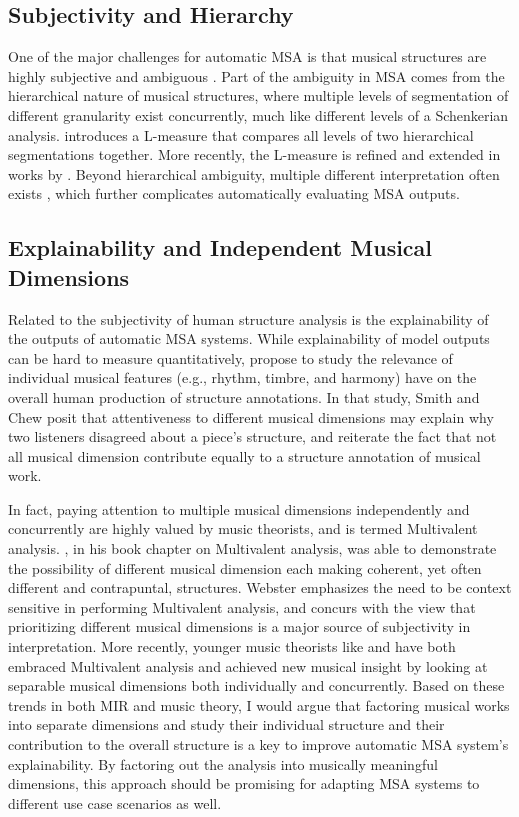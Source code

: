 \subsection{Subjectivity and Hierarchy}
One of the major challenges for automatic MSA is that musical structures are highly subjective and ambiguous \citep{smith2014b}.
Part of the ambiguity in MSA comes from the hierarchical nature of musical structures, where multiple levels of segmentation of different granularity exist concurrently, much like different levels of a Schenkerian analysis.
\cite{mcfee2017evaluating} introduces a L-measure that compares all levels of two hierarchical segmentations together.
More recently, the L-measure is refined and extended in works by \cite{kinnaird2021automatic}.
Beyond hierarchical ambiguity, multiple different interpretation often exists \citep{wang2017, serra2014}, which further complicates automatically evaluating MSA outputs.

\subsection{Explainability and Independent Musical Dimensions}
Related to the subjectivity of human structure analysis is the explainability of the outputs of automatic MSA systems.
While explainability of model outputs can be hard to measure quantitatively, \cite{smith2013quadratic} propose to study the relevance of individual musical features (e.g., rhythm, timbre, and harmony) have on the overall human production of structure annotations.
In that study, Smith and Chew posit that attentiveness to different musical dimensions may explain why two listeners disagreed about a piece's structure, and reiterate the fact that not all musical dimension contribute equally to a structure annotation of musical work.

In fact, paying attention to multiple musical dimensions independently and concurrently are highly valued by music theorists, and is termed Multivalent analysis.
\cite{webster2009multivalent}, in his book chapter on Multivalent analysis, was able to demonstrate the possibility of different musical dimension each making coherent, yet often different and contrapuntal, structures.
Webster emphasizes the need to be context sensitive in performing Multivalent analysis, and concurs with the view that prioritizing different musical dimensions is a major source of subjectivity in interpretation.
More recently, younger music theorists like \cite{brody2016parametric} and \cite{yust2018organized} have both embraced Multivalent analysis and achieved new musical insight by looking at separable musical dimensions both individually and concurrently.
Based on these trends in both MIR and music theory, I would argue that factoring musical works into separate dimensions and study their individual structure and their contribution to the overall structure is a key to improve automatic MSA system's explainability.
By factoring out the analysis into musically meaningful dimensions, this approach should be promising for adapting MSA systems to different use case scenarios as well.

